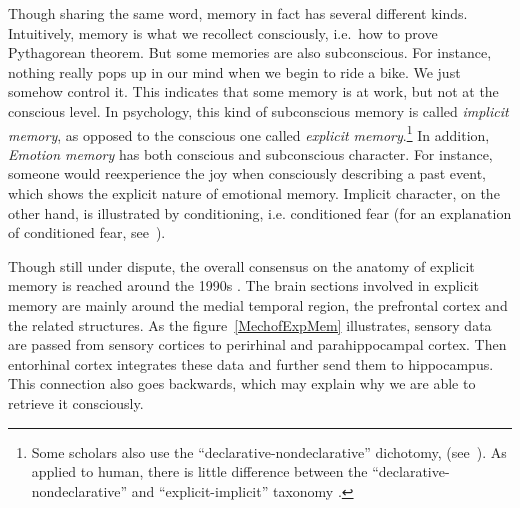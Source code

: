 \documentclass{article}
\begin{document}
Though sharing the same word, memory in fact has several different kinds. Intuitively, memory is what we recollect consciously, i.e.\ how to prove Pythagorean theorem. But some memories are also subconscious. For instance, nothing really pops up in our mind when we begin to ride a bike. We just somehow control it. This indicates that some memory is at work, but not at the conscious level. In psychology, this kind of subconscious memory is called \textit{implicit memory}, as opposed to the conscious one called \textit{explicit memory}.\footnote{Some scholars also use the ``declarative-nondeclarative'' dichotomy, (see~\cite{michaelianMemory2017}). As applied to human, there is little difference between the ``declarative-nondeclarative'' and ``explicit-implicit'' taxonomy \autocite[p.480]{kolbIntroductionBrainBehavior2019}.} In addition, \textit{Emotion memory} has both conscious and subconscious character. For instance, someone would reexperience the joy when consciously describing a past event, which shows the explicit nature of emotional memory. Implicit character, on the other hand, is illustrated by conditioning, i.e. conditioned fear (for an explanation of conditioned fear, see~\cite[p.478]{kolbIntroductionBrainBehavior2019}). 

Though still under dispute, the overall consensus on the anatomy of explicit memory is reached around the 1990s \autocite[p. 487]{kolbIntroductionBrainBehavior2019}. The brain sections involved in explicit memory are mainly around the medial temporal region, the prefrontal cortex and the related structures. As the figure~\ref{MechofExpMem} illustrates, sensory data are passed from sensory cortices to perirhinal and parahippocampal cortex. Then entorhinal cortex integrates these data and further send them to hippocampus. This connection also goes backwards, which may explain why we are able to retrieve it consciously. 
\end{document}
